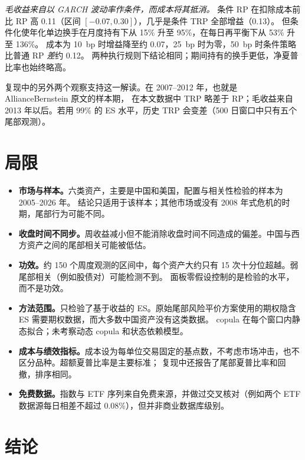 \documentclass[11pt,UTF8]{ctexart}
\newcommand{\1}{\mathbf{1}}
\begin{document}
\emph{毛收益来自以 GARCH 波动率作条件，而成本将其抵消。}
条件 RP 在扣除成本前比 RP 高 0.11（区间 $[-0.07,0.30]$），几乎是条件 TRP 全部增益（0.13）。
但条件化使年化单边换手在月度持有下从 15\% 升至 95\%，在每日再平衡下从 53\% 升至 136\%。
成本为 10~bp 时增益降至约 0.07，25~bp 时为零，50~bp 时条件策略比普通 RP \emph{差}约 0.12。
两种执行规则下结论相同；期间持有的换手更低，净夏普比率也始终略高。

复现中的另外两个观察支持这一解读。在 2007--2012 年，也就是 AllianceBernstein 原文的样本期，
在本文数据中 TRP 略差于 RP；毛收益来自 2013 年以后。若用 99\% 的 ES 水平，历史 TRP 会变差（500 日窗口中只有五个尾部观测）。

\section{局限}

\begin{itemize}
\item \textbf{市场与样本。}六类资产，主要是中国和美国，配置与相关性检验的样本为 2005--2026 年。
结论只适用于该样本；其他市场或没有 2008 年式危机的时期，尾部行为可能不同。
\item \textbf{收盘时间不同步。}周收益减小但不能消除收盘时间不同造成的偏差。中国与西方资产之间的尾部相关可能被低估。
\item \textbf{功效。}约 150 个周度观测的区间中，每个资产大约只有 15 次十分位超越。弱尾部相关（例如股债对）可能检测不到。
面板零假设控制的是检验的水平，而不是功效。
\item \textbf{方法范围。}只检验了基于收益的 ES。原始尾部风险平价方案使用的期权隐含 ES 需要期权数据，而大多数中国资产没有这类数据。
copula 在每个窗口内静态拟合；未考察动态 copula \citep{patton2006} 和状态依赖模型。
\item \textbf{成本与绩效指标。}成本设为每单位交易固定的基点数，不考虑市场冲击，也不区分品种。超额夏普比率是主要标准；
复现中还报告了尾部夏普比率和回撤，排序相同。
\item \textbf{免费数据。}指数与 ETF 序列来自免费来源，并做过交叉核对（例如两个 ETF 数据源每日相差不超过 0.08\%），但并非商业数据库级别。
\end{itemize}

\section{结论}
\end{document}
